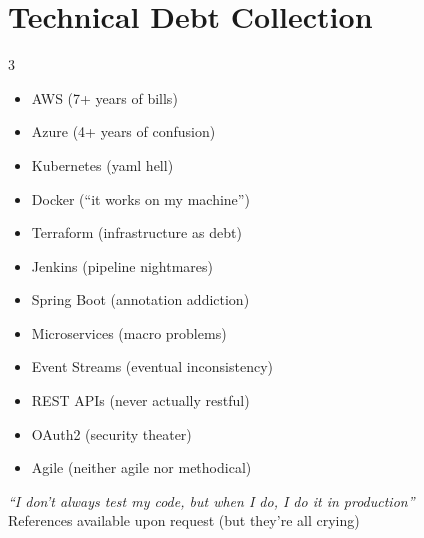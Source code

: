 \documentclass[11pt,a4paper]{article}
\begin{document}
\section{Technical Debt Collection}
\begin{multicols}{3}
\footnotesize
\begin{itemize}[leftmargin=*,itemsep=0pt,topsep=0pt]
    \item AWS (7+ years of bills)
    \item Azure (4+ years of confusion)
    \item Kubernetes (yaml hell)
    \item Docker (``it works on my machine'')
    \item Terraform (infrastructure as debt)
    \item Jenkins (pipeline nightmares)
    \item Spring Boot (annotation addiction)
    \item Microservices (macro problems)
    \item Event Streams (eventual inconsistency)
    \item REST APIs (never actually restful)
    \item OAuth2 (security theater)
    \item Agile (neither agile nor methodical)
\end{itemize}
\end{multicols}
\vfill
\begin{center}
    \textit{``I don't always test my code, but when I do, I do it in production''}\\[0.5em]
    \small\color{graytext}References available upon request (but they're all crying)
\end{center}
\end{document}
